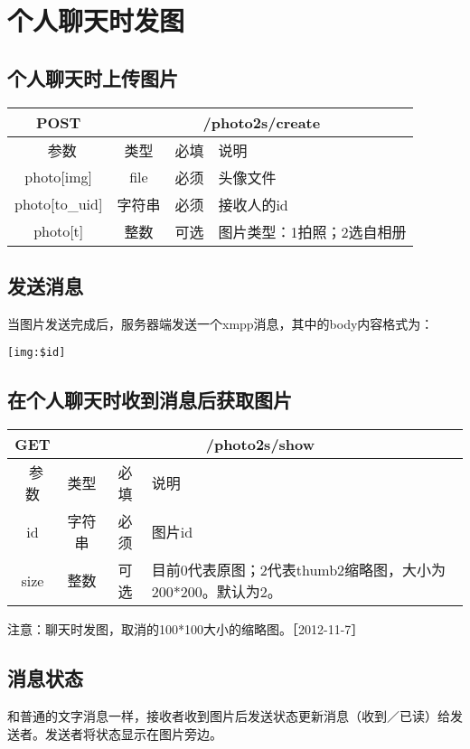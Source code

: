 \section{个人聊天时发图}

\subsection{个人聊天时上传图片}

\begin{table}[H]
   \begin{center}
\begin{tabular}{|c|c|c|p{12cm}|}
\hline
POST & \multicolumn{3}{|c|}{/photo2s/create} \\
\hline\hline
 \  参数  & 类型 & 必填 &  说明  \\
\hline
 photo[img]  & file & 必须 &  头像文件\\
 \hline
 photo[to\_uid]  & 字符串 & 必须 &  接收人的id\\
\hline
  photo[t]  & 整数 & 可选 &  图片类型：1拍照；2选自相册\\
 \hline
\end{tabular}
   \end{center}
\end{table}


\subsection{发送消息}
当图片发送完成后，服务器端发送一个xmpp消息，其中的body内容格式为：

\begin{verbatim}
[img:$id]

\end{verbatim}

\subsection{在个人聊天时收到消息后获取图片}
\begin{table}[H]
   \begin{center}
\begin{tabular}{|c|c|c|p{12cm}|}
\hline
GET & \multicolumn{3}{|c|}{/photo2s/show} \\
\hline\hline
 \  参数  & 类型 & 必填 &  说明  \\
  \hline
 id  & 字符串 & 必须 & 图片id\\
\hline
 size  & 整数 & 可选 &  目前0代表原图；2代表thumb2缩略图，大小为200*200。默认为2。\\ 
\hline
\end{tabular}
   \end{center}
\end{table}

注意：聊天时发图，取消的100*100大小的缩略图。［2012-11-7］


\subsection{消息状态}
和普通的文字消息一样，接收者收到图片后发送状态更新消息（收到／已读）给发送者。发送者将状态显示在图片旁边。

